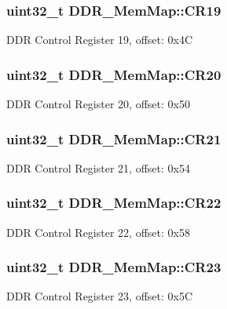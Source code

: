 \subsubsection[{C\+R19}]{\setlength{\rightskip}{0pt plus 5cm}uint32\+\_\+t D\+D\+R\+\_\+\+Mem\+Map\+::\+C\+R19}\label{struct_d_d_r___mem_map_ae1ae024bcbfeb8890f2715de2be3e874}
D\+D\+R Control Register 19, offset\+: 0x4\+C \hypertarget{struct_d_d_r___mem_map_a2d33b2e232cec2b6947d34472530b7dc}{}
\subsubsection[{C\+R20}]{\setlength{\rightskip}{0pt plus 5cm}uint32\+\_\+t D\+D\+R\+\_\+\+Mem\+Map\+::\+C\+R20}\label{struct_d_d_r___mem_map_a2d33b2e232cec2b6947d34472530b7dc}
D\+D\+R Control Register 20, offset\+: 0x50 \hypertarget{struct_d_d_r___mem_map_a2aaa8427d80f12629e4b41da62d1e195}{}
\subsubsection[{C\+R21}]{\setlength{\rightskip}{0pt plus 5cm}uint32\+\_\+t D\+D\+R\+\_\+\+Mem\+Map\+::\+C\+R21}\label{struct_d_d_r___mem_map_a2aaa8427d80f12629e4b41da62d1e195}
D\+D\+R Control Register 21, offset\+: 0x54 \hypertarget{struct_d_d_r___mem_map_ac86692174133a7cdd0e1700d91b2dc2a}{}
\subsubsection[{C\+R22}]{\setlength{\rightskip}{0pt plus 5cm}uint32\+\_\+t D\+D\+R\+\_\+\+Mem\+Map\+::\+C\+R22}\label{struct_d_d_r___mem_map_ac86692174133a7cdd0e1700d91b2dc2a}
D\+D\+R Control Register 22, offset\+: 0x58 \hypertarget{struct_d_d_r___mem_map_ae8eaae113b94ff5987e0e97ebe7c9703}{}
\subsubsection[{C\+R23}]{\setlength{\rightskip}{0pt plus 5cm}uint32\+\_\+t D\+D\+R\+\_\+\+Mem\+Map\+::\+C\+R23}\label{struct_d_d_r___mem_map_ae8eaae113b94ff5987e0e97ebe7c9703}
D\+D\+R Control Register 23, offset\+: 0x5\+C \hypertarget{struct_d_d_r___mem_map_a6fa5ddda992c02d241e62662e4cb1e5f}{}
